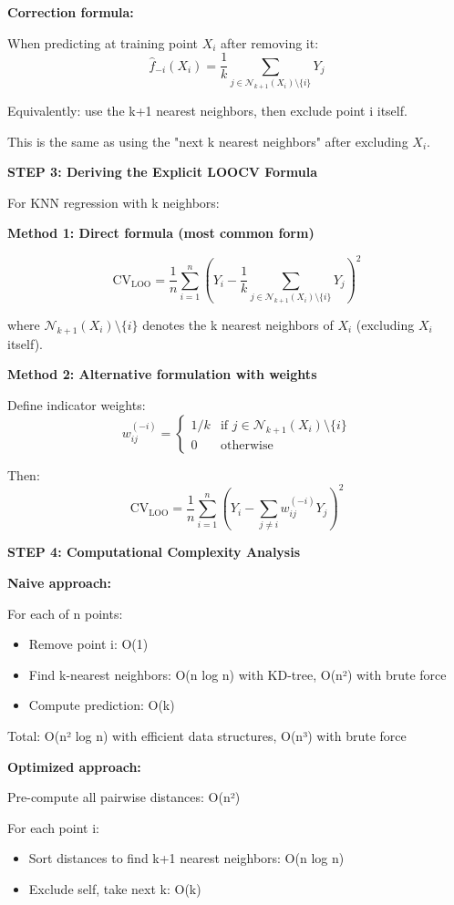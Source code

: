 \documentclass[12pt]{article}
\begin{document}
\begin{solution}
\textbf{Correction formula:}

When predicting at training point $X_i$ after removing it:
\[
\hat{f}_{-i}(X_i) = \frac{1}{k}\sum_{j \in \mathcal{N}_{k+1}(X_i) \setminus \{i\}} Y_j
\]

Equivalently: use the k+1 nearest neighbors, then exclude point i itself.

This is the same as using the "next k nearest neighbors" after excluding $X_i$.

\textbf{STEP 3: Deriving the Explicit LOOCV Formula}

For KNN regression with k neighbors:

\textbf{Method 1: Direct formula (most common form)}

\[
\boxed{
\text{CV}_{\text{LOO}} = \frac{1}{n}\sum_{i=1}^n \left(Y_i - \frac{1}{k}\sum_{j \in \mathcal{N}_{k+1}(X_i) \setminus \{i\}} Y_j\right)^2
}
\]

where $\mathcal{N}_{k+1}(X_i) \setminus \{i\}$ denotes the k nearest neighbors of $X_i$ (excluding $X_i$ itself).

\textbf{Method 2: Alternative formulation with weights}

Define indicator weights:
\[
w_{ij}^{(-i)} = \begin{cases}
1/k & \text{if } j \in \mathcal{N}_{k+1}(X_i) \setminus \{i\} \\
0 & \text{otherwise}
\end{cases}
\]

Then:
\[
\text{CV}_{\text{LOO}} = \frac{1}{n}\sum_{i=1}^n \left(Y_i - \sum_{j \neq i} w_{ij}^{(-i)} Y_j\right)^2
\]

\textbf{STEP 4: Computational Complexity Analysis}

\textbf{Naive approach:}

For each of n points:
\begin{itemize}
    \item Remove point i: O(1)
    \item Find k-nearest neighbors: O(n log n) with KD-tree, O(n²) with brute force
    \item Compute prediction: O(k)
\end{itemize}

Total: O(n² log n) with efficient data structures, O(n³) with brute force

\textbf{Optimized approach:}

Pre-compute all pairwise distances: O(n²)

For each point i:
\begin{itemize}
    \item Sort distances to find k+1 nearest neighbors: O(n log n)
    \item Exclude self, take next k: O(k)
\end{itemize}


\end{solution}
\end{document}
